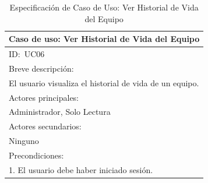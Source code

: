 \documentclass[stu, 12pt, letterpaper, donotrepeattitle, floatsintext, natbib]{apa7}
\begin{document}
\begin{longtable}{@{} p{16.5cm} @{}}
    \caption{Especificación de Caso de Uso: Ver Historial de Vida del Equipo}\label{tab:UC06}                                                                                           \\ \toprule
    \multicolumn{1}{c}{Caso de uso: Ver Historial de Vida del Equipo}                                                                                                                   \\ \midrule
    ID:~UC06                                                                                                                                                                            \\ \midrule
    Breve descripción:                                                                                                                                                                  \\
    El usuario visualiza el historial de vida de un equipo.                                                                                                                             \\ \midrule
    Actores principales:                                                                                                                                                                \\
    Administrador, Solo Lectura                                                                                                                                                         \\ \midrule
    Actores secundarios:                                                                                                                                                                \\
    Ninguno                                                                                                                                                                             \\ \midrule
    Precondiciones:                                                                                                                                                                     \\
    1. El usuario debe haber iniciado sesión.                                                                                                                                           \\ \midrule

\end{longtable}
\end{document}
